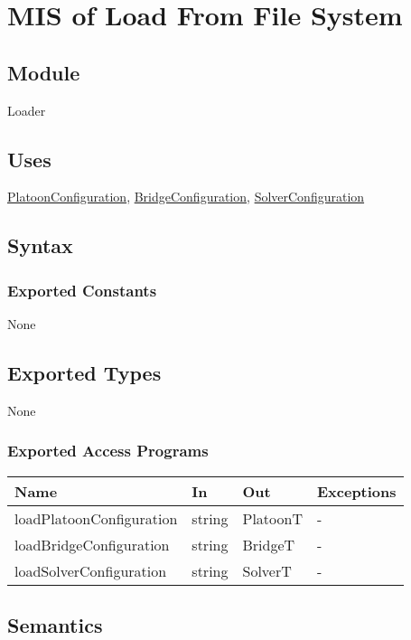 \documentclass[12pt, titlepage]{article}
\begin{document}
\section{MIS of Load From File System}

\subsection{Module}\label{Loader} 

Loader

\subsection{Uses}
\hyperref[PlatoonConfiguration]{PlatoonConfiguration}, \hyperref[BridgeConfiguration]{BridgeConfiguration}, \hyperref[SolverConfiguration]{SolverConfiguration}

\subsection{Syntax}

\subsubsection{Exported Constants}
None
\subsection{Exported Types}
None
\subsubsection{Exported Access Programs}
\begin{center}
\begin{tabular}{p{5cm} p{3cm} p{3cm} p{1cm}}
\hline
\textbf{Name} & \textbf{In} & \textbf{Out} & \textbf{Exceptions} \\
\hline
loadPlatoonConfiguration & string & PlatoonT & - \\
\hline
loadBridgeConfiguration & string & BridgeT & - \\
\hline
loadSolverConfiguration & string & SolverT & - \\
\hline
\end{tabular}
\end{center}

\subsection{Semantics}
\end{document}
